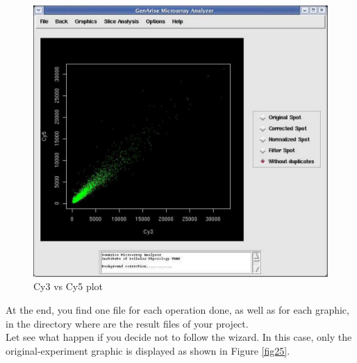 \documentclass[12pt]{article}
\begin{document}
\begin{figure}
\begin{center}
\includegraphics[scale= 0.3]{./images/nodupsCy3vsCy5.pdf}
\caption{Cy3 vs Cy5 plot \label{fig24}}
\end{center}
\end{figure}

At the end, you find one file for each operation done, as well as for each graphic, in the directory where are the result files of your project.\\

Let see what happen if you decide not to follow the wizard. In this case, only the original-experiment graphic is displayed as shown in Figure \ref{fig25}.\\
\end{document}
